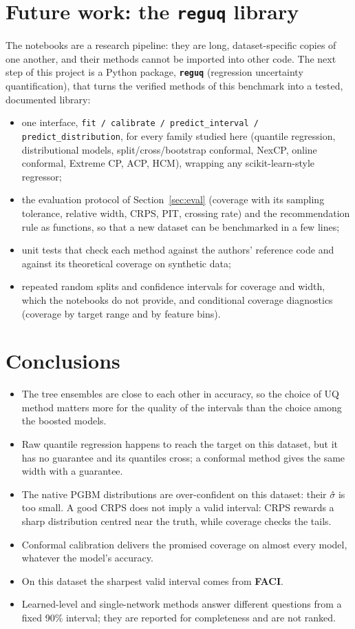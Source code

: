 \documentclass[11pt]{article}
\begin{document}
\section{Future work: the \texttt{reguq} library}\label{sec:future}
The notebooks are a research pipeline: they are long, dataset-specific copies of one another, and their methods cannot be imported
into other code. The next step of this project is a Python package, \textbf{\texttt{reguq}} (regression uncertainty quantification),
that turns the verified methods of this benchmark into a tested, documented library:
\begin{itemize}
\item one interface, \texttt{fit / calibrate / predict\_interval / predict\_distribution}, for every family studied here (quantile
regression, distributional models, split/cross/bootstrap conformal, NexCP, online conformal, Extreme CP, ACP, HCM), wrapping any
scikit-learn-style regressor;
\item the evaluation protocol of Section~\ref{sec:eval} (coverage with its sampling tolerance, relative width, CRPS, PIT, crossing
rate) and the recommendation rule as functions, so that a new dataset can be benchmarked in a few lines;
\item unit tests that check each method against the authors' reference code and against its theoretical coverage on synthetic data;
\item repeated random splits and confidence intervals for coverage and width, which the notebooks do not provide, and conditional
coverage diagnostics (coverage by target range and by feature bins).
\end{itemize}

\section{Conclusions}
\begin{itemize}
\item The tree ensembles are close to each other in accuracy, so the choice of UQ method matters more for the quality of the intervals than the choice among the boosted models.
\item Raw quantile regression happens to reach the target on this dataset, but it has no guarantee and its quantiles cross; a conformal method gives the same width with a guarantee.
\item The native PGBM distributions are over-confident on this dataset: their $\sigma$̂ is too small. A good CRPS does not imply a valid interval: CRPS rewards a sharp distribution centred near the truth, while coverage checks the tails.
\item Conformal calibration delivers the promised coverage on almost every model, whatever the model's accuracy.
\item On this dataset the sharpest valid interval comes from \textbf{FACI}.
\item Learned-level and single-network methods answer different questions from a fixed 90\% interval; they are reported for completeness and are not ranked.
\end{itemize}
\end{document}
